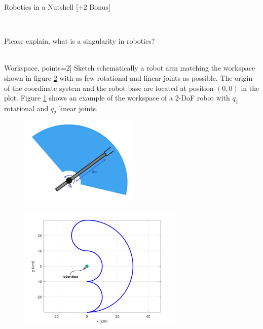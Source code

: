 \documentclass[
	ngerman,
	points=true,%
	]{tudaexercise}
\begin{document}
\begin{task}[points=12]{Robotics in a Nutshell [+2 Bonus]}
\begin{subtask}[title=Differential Kinematics, points=4]{}
        
        \todo \\

    \end{subtask}{}
    
    \begin{subtask}[title=Singularities, points=1]{}
        Please explain, what is a singularity in robotics? \\
        
        \todo \\
    
    
    \end{subtask}{}
    
    \begin{subtask}[title=[Bonus] Workspace, points=2]{}
        Sketch schematically a robot arm matching the workspace shown in figure \ref{fig:workspace_empty} with as few rotational and linear joints as possible. The origin of the coordinate system and the robot base are located at position $(0, 0)$ in the plot. Figure \ref{fig:robot_with_workspace_example} shows an example of the workspace of a $2$-DoF robot with $q_1$ rotational and $q_2$ linear joints.
        \begin{figure}[H]
            \centering
            \includegraphics[width=0.5\textwidth]{figures/workspace_example.png}
            \label{fig:robot_with_workspace_example}
        \end{figure} 
        
        \begin{figure}[H]
            \centering
            \includegraphics[width=0.7\textwidth]{figures/workspace_empty.pdf}
            \label{fig:workspace_empty}
        \end{figure}  
         

\end{subtask}
\end{task}
\end{document}
